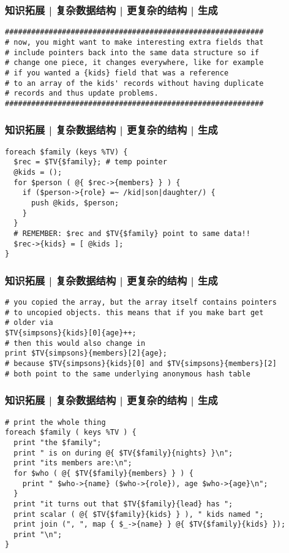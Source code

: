 \begin{frame}[fragile]
  \frametitle{知识拓展 | 复杂数据结构 | 更复杂的结构 | 生成}
\begin{lstlisting}[basicstyle=\small\tt]
###########################################################
# now, you might want to make interesting extra fields that
# include pointers back into the same data structure so if
# change one piece, it changes everywhere, like for example
# if you wanted a {kids} field that was a reference
# to an array of the kids' records without having duplicate
# records and thus update problems.
###########################################################
\end{lstlisting}
\end{frame}

\begin{frame}[fragile]
  \frametitle{知识拓展 | 复杂数据结构 | 更复杂的结构 | 生成}
\begin{lstlisting}
foreach $family (keys %TV) {
  $rec = $TV{$family}; # temp pointer
  @kids = ();
  for $person ( @{ $rec->{members} } ) {
    if ($person->{role} =~ /kid|son|daughter/) {
      push @kids, $person;
    }
  }
  # REMEMBER: $rec and $TV{$family} point to same data!!
  $rec->{kids} = [ @kids ];
}
\end{lstlisting}
\end{frame}

\begin{frame}[fragile]
  \frametitle{知识拓展 | 复杂数据结构 | 更复杂的结构 | 生成}
\begin{lstlisting}
# you copied the array, but the array itself contains pointers
# to uncopied objects. this means that if you make bart get
# older via
$TV{simpsons}{kids}[0]{age}++;
# then this would also change in
print $TV{simpsons}{members}[2]{age};
# because $TV{simpsons}{kids}[0] and $TV{simpsons}{members}[2]
# both point to the same underlying anonymous hash table
\end{lstlisting}
\end{frame}

\begin{frame}[fragile]
  \frametitle{知识拓展 | 复杂数据结构 | 更复杂的结构 | 生成}
\begin{lstlisting}[basicstyle=\small\tt]
# print the whole thing
foreach $family ( keys %TV ) {
  print "the $family";
  print " is on during @{ $TV{$family}{nights} }\n";
  print "its members are:\n";
  for $who ( @{ $TV{$family}{members} } ) {
    print " $who->{name} ($who->{role}), age $who->{age}\n";
  }
  print "it turns out that $TV{$family}{lead} has ";
  print scalar ( @{ $TV{$family}{kids} } ), " kids named ";
  print join (", ", map { $_->{name} } @{ $TV{$family}{kids} });
  print "\n";
}
\end{lstlisting}
\end{frame}

